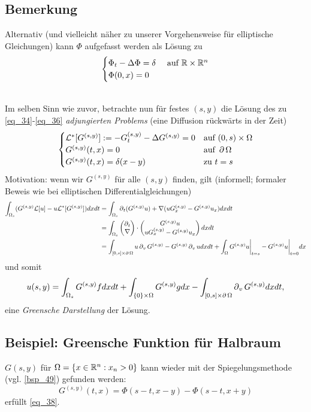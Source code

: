 \subsection{Bemerkung}
\label{bem_90}
	Alternativ (und vielleicht näher zu unserer Vorgehensweise für elliptische Gleichungen) kann $\Phi$  aufgefasst werden als Lösung zu
	\[ \begin{cases}
		\Phi_t - \Delta \Phi = \delta & \text{ auf } \mathbb{R} \times \mathbb{R}^n \\
		\Phi(0,x) = 0 \end{cases} \]

\mbox{} \\
Im selben Sinn wie zuvor, betrachte nun für festes $(s,y)$ die Lösung des zu \eqref{eq_34}-\eqref{eq_36} \textit{adjungierten Problems} (eine Diffusion rückwärts in der Zeit)
\begin{equation}
	\begin{cases}
		\mathcal{L}^*[G^{(s,y)}] := -G_t^{(s,y)} - \Delta G^{(s,y)} = 0 & \text{auf } (0,s) \times \Omega \\
		G^{(s,y)}(t,x) = 0 & \text{auf } \operatorname{\partial} \Omega \\
		G^{(s,y)}(t,x) = \delta(x-y) & \text{zu } t=s \end{cases} \label{eq_38}
\end{equation}
Motivation: wenn wir $G^{(s,y)}$ für alle $(s,y)$ finden, gilt (informell; formaler Beweis wie bei elliptischen Differentialgleichungen)
\begin{equation}
\begin{aligned}
	\int_{\Omega_s} (G^{(s,y)} \mathcal{L}[u] - u \mathcal{L}^*[G^{(s,y)}]) dxdt
	&= \int_{\Omega_s} \operatorname{\partial}_t (G^{(s,y)} u) + \nabla(uG_x^{(s,y)} - G^{(s,y)} u_x) dx dt \\ \notag
	&= \int_{\Omega_s} \begin{pmatrix} \operatorname{\partial}_t \\ \nabla \end{pmatrix} \cdot \begin{pmatrix} G^{(s,y)} u \\ uG_x^{(s,y)} - G^{(s,y)} u_x \end{pmatrix} dxdt \\
	&= \int_{[0,s]\times \operatorname{\partial}\Omega} u \operatorname{\partial}_v G^{(s,y)} - G^{(s,y)} \operatorname{\partial}_v u dx dt + \int_\Omega G^{(s,y)} u \bigg|_{t=s} - G^{(s,y)} u \bigg|_{t=0} dx
\end{aligned}
\end{equation}
und somit
\[ u(s,y) = \int_{\Omega_s} G^{(s,y)} f dx dt + \int_{\{0\} \times \Omega} G^{(s,y)} gdx - \int_{[0,s]\times \operatorname{\partial} \Omega} \operatorname{\partial}_v G^{(s,y)} dx dt,\]
eine \textit{Greensche Darstellung} der Lösung.

\subsection{Beispiel: Greensche Funktion für Halbraum}
\label{bsp_91}
	$G(s,y)$ für $\Omega = \{x \in \mathbb{R}^n : x_n > 0\}$ kann wieder mit der Spiegelungsmethode (vgl. \ref{bsp_49}) gefunden werden:
	\[ G^{(s,y)}(t,x) = \Phi(s-t,x-y) - \Phi(s-t,x+y) \]
	erfüllt \eqref{eq_38}.
\newpage